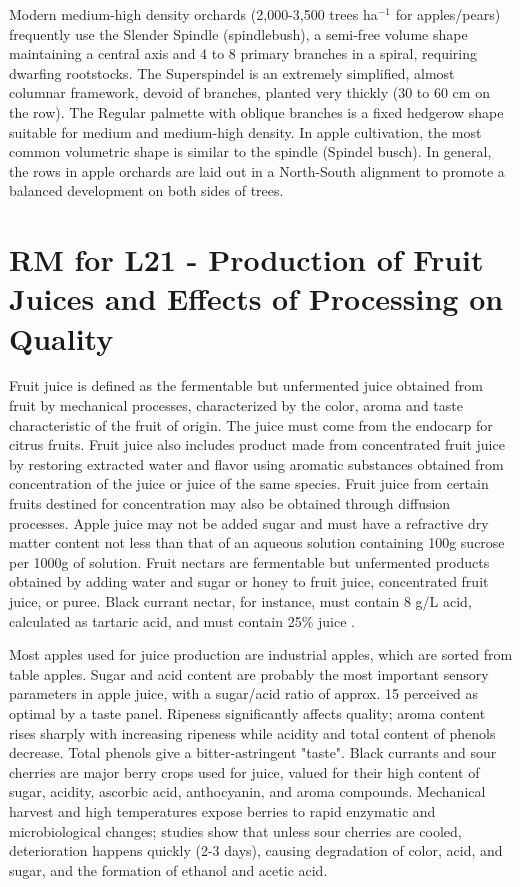 \vspace{0.5em}
Modern medium-high density orchards (2,000-3,500 trees ha$^{-1}$ for apples/pears) frequently use the Slender Spindle (spindlebush), a semi-free volume shape maintaining a central axis and 4 to 8 primary branches in a spiral, requiring dwarfing rootstocks. The Superspindel is an extremely simplified, almost columnar framework, devoid of branches, planted very thickly (30 to 60 cm on the row). The Regular palmette with oblique branches is a fixed hedgerow shape suitable for medium and medium-high density. In apple cultivation, the most common volumetric shape is similar to the spindle (Spindel busch). In general, the rows in apple orchards are laid out in a North-South alignment to promote a balanced development on both sides of trees.


\section{RM for L21 - Production of Fruit Juices and Effects of Processing on Quality}

Fruit juice is defined as the fermentable but unfermented juice obtained from fruit by mechanical processes, characterized by the color, aroma and taste characteristic of the fruit of origin. The juice must come from the endocarp for citrus fruits. Fruit juice also includes product made from concentrated fruit juice by restoring extracted water and flavor using aromatic substances obtained from concentration of the juice or juice of the same species. Fruit juice from certain fruits destined for concentration may also be obtained through diffusion processes. Apple juice may not be added sugar and must have a refractive dry matter content not less than that of an aqueous solution containing 100g sucrose per 1000g of solution. Fruit nectars are fermentable but unfermented products obtained by adding water and sugar or honey to fruit juice, concentrated fruit juice, or puree. Black currant nectar, for instance, must contain 8 g/L acid, calculated as tartaric acid, and must contain 25\% juice \cite*{rmb_04_L21_postharvest_biology_technology_fruits_vegetables_flowers}.

\vspace{0.5em}
Most apples used for juice production are industrial apples, which are sorted from table apples. Sugar and acid content are probably the most important sensory parameters in apple juice, with a sugar/acid ratio of approx. 15 perceived as optimal by a taste panel. Ripeness significantly affects quality; aroma content rises sharply with increasing ripeness while acidity and total content of phenols decrease. Total phenols give a bitter-astringent "taste". Black currants and sour cherries are major berry crops used for juice, valued for their high content of sugar, acidity, ascorbic acid, anthocyanin, and aroma compounds. Mechanical harvest and high temperatures expose berries to rapid enzymatic and microbiological changes; studies show that unless sour cherries are cooled, deterioration happens quickly (2-3 days), causing degradation of color, acid, and sugar, and the formation of ethanol and acetic acid.

